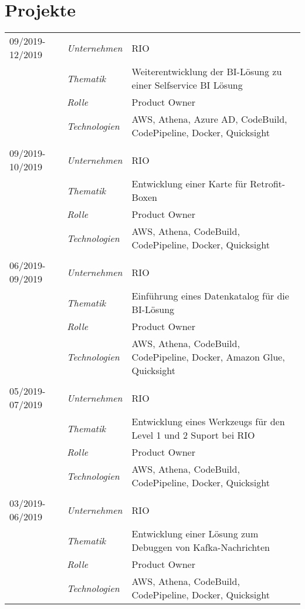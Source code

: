 \section*{Projekte}
\renewcommand{\arraystretch}{1.3}
\begin{longtable}{@{}>{}p{4cm}>{\itshape}p{2cm}>{}p{9cm}}
09/2019-12/2019 & Unternehmen   & RIO\\
\nopagebreak		& Thematik	    & Weiterentwicklung der BI-Lösung zu einer Selfservice BI Lösung\\
\nopagebreak		& Rolle 	      & Product Owner\\
\nopagebreak		& Technologien	& AWS, Athena, Azure AD, CodeBuild, CodePipeline, Docker, Quicksight\\
\\
09/2019-10/2019 & Unternehmen   & RIO\\
\nopagebreak		& Thematik	    & Entwicklung einer Karte für Retrofit-Boxen\\
\nopagebreak		& Rolle 	      & Product Owner\\
\nopagebreak		& Technologien	& AWS, Athena, CodeBuild, CodePipeline, Docker, Quicksight\\
\\
06/2019-09/2019 & Unternehmen   & RIO\\
\nopagebreak		& Thematik	    & Einführung eines Datenkatalog für die BI-Lösung\\
\nopagebreak		& Rolle 	      & Product Owner\\
\nopagebreak		& Technologien	& AWS, Athena, CodeBuild, CodePipeline, Docker, Amazon Glue, Quicksight\\
\\
05/2019-07/2019 & Unternehmen   & RIO\\
\nopagebreak		& Thematik	    & Entwicklung eines Werkzeugs für den Level 1 und 2 Suport bei RIO\\
\nopagebreak		& Rolle 	      & Product Owner\\
\nopagebreak		& Technologien	& AWS, Athena, CodeBuild, CodePipeline, Docker, Quicksight\\
\\
03/2019-06/2019 & Unternehmen   & RIO\\
\nopagebreak		& Thematik	    & Entwicklung einer Lösung zum Debuggen von Kafka-Nachrichten\\
\nopagebreak		& Rolle 	      & Product Owner\\
\nopagebreak		& Technologien	& AWS, Athena, CodeBuild, CodePipeline, Docker, Quicksight\\

\end{longtable}
